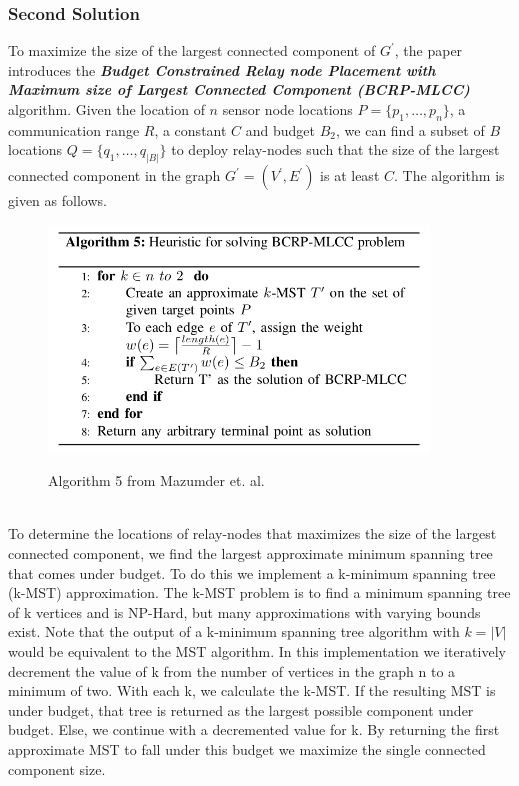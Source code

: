 \documentclass{article}
\begin{document}
\subsubsection*{Second Solution}
To maximize the size of the largest connected component of $G^\prime$, the paper introduces the \textbf{\textit{Budget Constrained Relay node Placement with Maximum size of Largest Connected Component (BCRP-MLCC)}} algorithm.
Given the location of $n$ sensor node locations $P=\{p_1, \hdots, p_n\}$, a communication range $R$, a constant $C$ and budget $B_2$, we can find a subset of $B$ locations $Q=\{q_1, \hdots, q_{|B|}\}$ to deploy relay-nodes such that the size of the largest connected component in the graph $G^\prime=(V^\prime, E^\prime)$ is at least $C$.
The algorithm is given as follows.
\begin{figure}[h]
\centering
\includegraphics[width=0.9\textwidth]{Alg5.png}
\label{alg5}
\caption{Algorithm 5 from Mazumder et. al.}
\end{figure}\\

To determine the locations of relay-nodes that maximizes the size of the largest connected component, we find the largest approximate minimum spanning tree that comes under budget.
To do this we implement a k-minimum spanning tree (k-MST) approximation.
The k-MST problem is to find a minimum spanning tree of k vertices and is NP-Hard, but many approximations with varying bounds exist.
Note that the output of a k-minimum spanning tree algorithm with $k = \left|V\right|$ would be equivalent to the MST algorithm.
In this implementation we iteratively decrement the value of k from the number of vertices in the graph n to a minimum of two.
With each k, we calculate the k-MST.
If the resulting MST is under budget, that tree is returned as the largest possible component under budget.
Else, we continue with a decremented value for k.
By returning the first approximate MST to fall under this budget we maximize the single connected component size.
\end{document}
